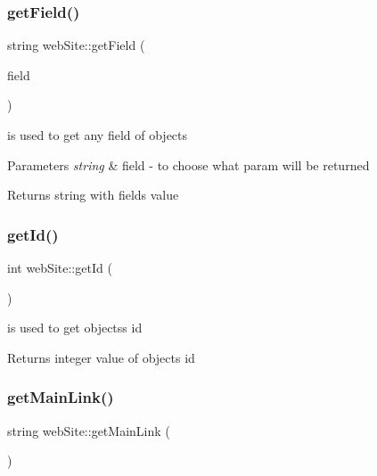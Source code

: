 \subsubsection{\texorpdfstring{get\+Field()}{getField()}}
{\footnotesize\ttfamily string web\+Site\+::get\+Field (\begin{DoxyParamCaption}\item[{string}]{field }\end{DoxyParamCaption})}



is used to get any field of objects 


\begin{DoxyParams}{Parameters}
{\em string} & field -\/ to choose what param will be returned \\
\hline
\end{DoxyParams}
\begin{DoxyReturn}{Returns}
string with field\textquotesingle{}s value 
\end{DoxyReturn}
\mbox{\label{classwebSite_a7ce06b3c0b9bf7a86e2d4cb76be09e8f}} 
\subsubsection{\texorpdfstring{get\+Id()}{getId()}}
{\footnotesize\ttfamily int web\+Site\+::get\+Id (\begin{DoxyParamCaption}{ }\end{DoxyParamCaption})}



is used to get objects\textquotesingle{}s id 

\begin{DoxyReturn}{Returns}
integer value of objects\textquotesingle{} id 
\end{DoxyReturn}
\mbox{\label{classwebSite_a631d0e50f03ae59258a55cf3056f00c8}} 
\subsubsection{\texorpdfstring{get\+Main\+Link()}{getMainLink()}}
{\footnotesize\ttfamily string web\+Site\+::get\+Main\+Link (\begin{DoxyParamCaption}{ }\end{DoxyParamCaption})}



